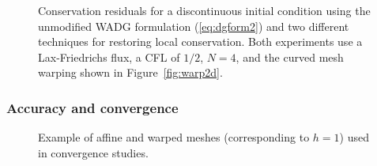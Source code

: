 \documentclass[10pt]{amsart}
\theoremstyle{definition}
\theoremstyle{lemma}
\theoremstyle{theorem}
\theoremstyle{assumption}
\begin{document}
{\begin{figure}
%
%
\caption{Conservation residuals for a discontinuous initial condition using the unmodified WADG formulation (\ref{eq:dgform2}) and two different techniques for restoring local conservation.  Both experiments use a Lax-Friedrichs flux, a CFL of $1/2$, $N=4$, and the curved mesh warping shown in Figure~\ref{fig:warp2d}.  }
\label{fig:cons}
\end{figure}


\subsubsection{Accuracy and convergence}

\begin{figure}
\centering
{}
\hspace{2em}
\caption{Example of affine and warped meshes (corresponding to $h = 1$) used in convergence studies.}
\label{fig:warp2dconverge}
\end{figure}

}
\end{document}
